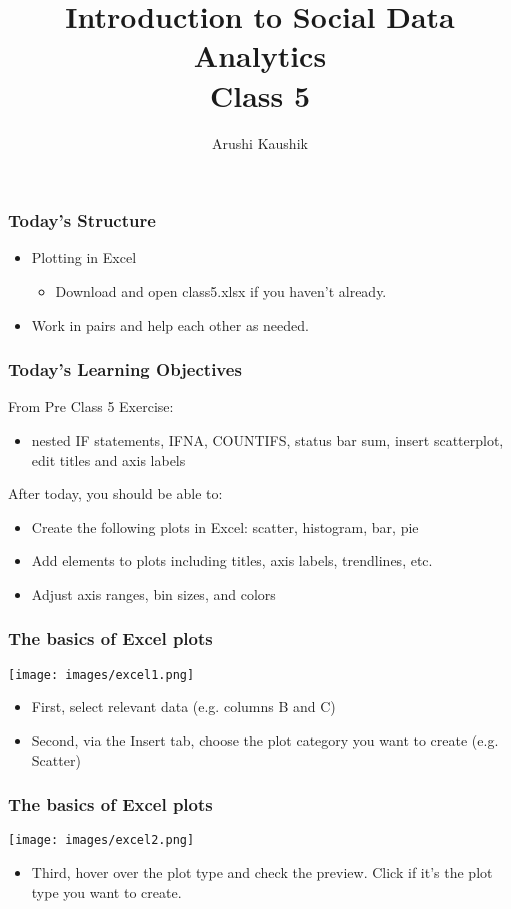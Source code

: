 \documentclass[11pt]{beamer}
\title[Class 5]{Introduction to Social Data Analytics \\
\bigskip Class 5}
\author[Kaushik]{Arushi Kaushik}
\institute[UCSD]{arkaushi@ucsd.edu}
\date{}
\begin{document}
\frame{\titlepage}

\begin{frame}
 \frametitle{Today's Structure}
\begin{itemize} \itemsep1em
\item Plotting in Excel 
	\begin{itemize}
	\item Download and open class5.xlsx if you haven't already.
	\end{itemize}
\item Work in pairs and help each other as needed.
\end{itemize}
\end{frame}

\begin{frame}
\frametitle{Today's Learning Objectives}
From Pre Class 5 Exercise: 
\begin{itemize}
	\item nested IF statements, IFNA, COUNTIFS, status bar sum, insert scatterplot, edit titles and axis labels
\end{itemize} \pause
\bigskip
After today, you should be able to:
\begin{itemize}
	\item Create the following plots in Excel: scatter, histogram, bar, pie
	\item Add elements to plots including titles, axis labels, trendlines, etc.
	\item Adjust axis ranges, bin sizes, and colors
\end{itemize} %
\end{frame}

\begin{frame}
\frametitle{The basics of Excel plots}
\begin{center}
	\texttt{[image: images/excel1.png]} 
\end{center}
\begin{itemize}
	\item First, select relevant data (e.g. columns B and C) \pause
	\item Second, via the Insert tab, choose the plot category you want to create (e.g. Scatter)
\end{itemize}
\end{frame}

\begin{frame}
\frametitle{The basics of Excel plots}
\begin{center}
	\texttt{[image: images/excel2.png]} 
\end{center}
\begin{itemize}
	\item Third, hover over the plot type and check the preview. Click if it's the plot type you want to create.
\end{itemize}
\end{frame}
\end{document}
